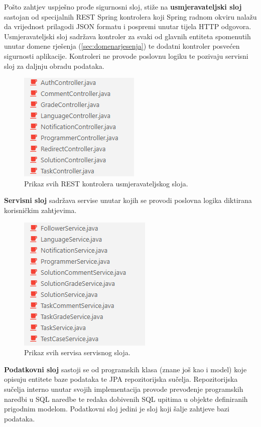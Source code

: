 \documentclass[times, utf8, zavrsni]{fer}
\begin{document}
	 		Pošto zahtjev uspješno prođe sigurnosni sloj, stiže na \textbf{usmjeravateljski sloj} sastojan od specijalnih REST Spring kontrolera koji Spring radnom okviru nalažu da vrijednost prilagodi JSON formatu i pospremi unutar tijela HTTP odgovora. Usmjeravateljski sloj sadržava kontroler za svaki od glavnih entiteta spomenutih unutar domene rješenja (\ref{sec:domenarjesenja}) te dodatni kontroler posvećen sigurnosti aplikacije. Kontroleri ne provode poslovnu logiku te pozivaju servisni sloj za daljnju obradu podataka. 
	 		\begin{figure}[H]
	 			\centering
	 			\includegraphics[scale=0.75]{pictures/prikazi/Controllers.png}
	 			\caption{Prikaz svih REST kontrolera usmjeravateljskog sloja.}
	 			\label{fig:controllers}
	 		\end{figure}
 		
	 		\textbf{Servisni sloj} sadržava servise unutar kojih se provodi poslovna logika diktirana korisničkim zahtjevima.
	 		\begin{figure}[H]
	 			\centering
	 			\includegraphics[scale=0.75]{pictures/prikazi/Services.png}
	 			\caption{Prikaz svih servisa servisnog sloja.}
	 			\label{fig:services}
	 		\end{figure}
 		
	 		\textbf{Podatkovni sloj} sastoji se od programskih klasa (znane još kao i model) koje opisuju entitete baze podataka te JPA repozitorijska  sučelja. Repozitorijska sučelja interno unutar svojih implementacija provode prevođenje programskih naredbi u SQL naredbe te redaka dobivenih SQL upitima u objekte definiranih prigodnim modelom. Podatkovni sloj jedini je sloj koji šalje zahtjeve bazi podataka.
			
\end{document}
